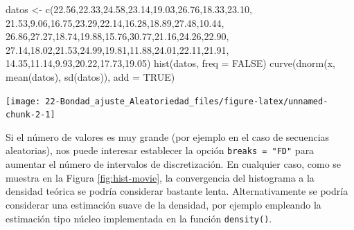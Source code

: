 \documentclass[
]{book}
\newenvironment{Shaded}{\begin{snugshade}}{\end{snugshade}}
\newcommand{\AttributeTok}[1]{\textcolor[rgb]{0.77,0.63,0.00}{#1}}
\newcommand{\ConstantTok}[1]{\textcolor[rgb]{0.00,0.00,0.00}{#1}}
\newcommand{\FloatTok}[1]{\textcolor[rgb]{0.00,0.00,0.81}{#1}}
\newcommand{\FunctionTok}[1]{\textcolor[rgb]{0.00,0.00,0.00}{#1}}
\newcommand{\NormalTok}[1]{#1}
\newcommand{\OtherTok}[1]{\textcolor[rgb]{0.56,0.35,0.01}{#1}}
\theoremstyle{break}
\theoremstyle{nonumberplain}
\begin{document}
\begin{Shaded}
\begin{Highlighting}[]
\NormalTok{datos }\OtherTok{\textless{}{-}} \FunctionTok{c}\NormalTok{(}\FloatTok{22.56}\NormalTok{,}\FloatTok{22.33}\NormalTok{,}\FloatTok{24.58}\NormalTok{,}\FloatTok{23.14}\NormalTok{,}\FloatTok{19.03}\NormalTok{,}\FloatTok{26.76}\NormalTok{,}\FloatTok{18.33}\NormalTok{,}\FloatTok{23.10}\NormalTok{,}
  \FloatTok{21.53}\NormalTok{,}\FloatTok{9.06}\NormalTok{,}\FloatTok{16.75}\NormalTok{,}\FloatTok{23.29}\NormalTok{,}\FloatTok{22.14}\NormalTok{,}\FloatTok{16.28}\NormalTok{,}\FloatTok{18.89}\NormalTok{,}\FloatTok{27.48}\NormalTok{,}\FloatTok{10.44}\NormalTok{,}
  \FloatTok{26.86}\NormalTok{,}\FloatTok{27.27}\NormalTok{,}\FloatTok{18.74}\NormalTok{,}\FloatTok{19.88}\NormalTok{,}\FloatTok{15.76}\NormalTok{,}\FloatTok{30.77}\NormalTok{,}\FloatTok{21.16}\NormalTok{,}\FloatTok{24.26}\NormalTok{,}\FloatTok{22.90}\NormalTok{,}
  \FloatTok{27.14}\NormalTok{,}\FloatTok{18.02}\NormalTok{,}\FloatTok{21.53}\NormalTok{,}\FloatTok{24.99}\NormalTok{,}\FloatTok{19.81}\NormalTok{,}\FloatTok{11.88}\NormalTok{,}\FloatTok{24.01}\NormalTok{,}\FloatTok{22.11}\NormalTok{,}\FloatTok{21.91}\NormalTok{,}
  \FloatTok{14.35}\NormalTok{,}\FloatTok{11.14}\NormalTok{,}\FloatTok{9.93}\NormalTok{,}\FloatTok{20.22}\NormalTok{,}\FloatTok{17.73}\NormalTok{,}\FloatTok{19.05}\NormalTok{)}
\FunctionTok{hist}\NormalTok{(datos, }\AttributeTok{freq =} \ConstantTok{FALSE}\NormalTok{)}
\FunctionTok{curve}\NormalTok{(}\FunctionTok{dnorm}\NormalTok{(x, }\FunctionTok{mean}\NormalTok{(datos), }\FunctionTok{sd}\NormalTok{(datos)), }\AttributeTok{add =} \ConstantTok{TRUE}\NormalTok{)}
\end{Highlighting}
\end{Shaded}

\begin{center}\texttt{[image: 22-Bondad\_ajuste\_Aleatoriedad\_files/figure-latex/unnamed-chunk-2-1]} \end{center}

Si el número de valores es muy grande (por ejemplo en el caso de secuencias aleatorias), nos puede interesar establecer la opción \texttt{breaks\ =\ "FD"} para aumentar el número de intervalos de discretización.
En cualquier caso, como se muestra en la Figura \ref{fig:hist-movie}, la convergencia del histograma a la densidad teórica se podría considerar bastante lenta.
Alternativamente se podría considerar una estimación suave de la densidad, por ejemplo empleando la estimación tipo núcleo implementada en la función \texttt{density()}.
\end{document}
